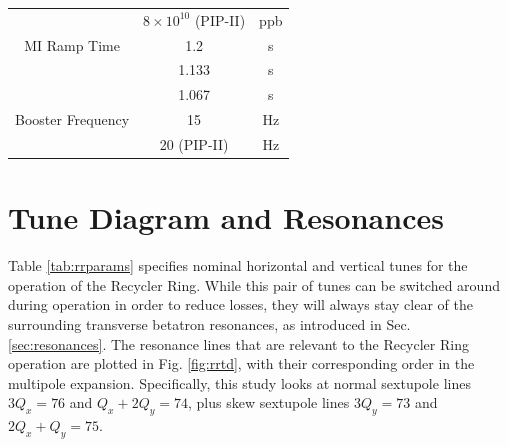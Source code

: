 \begin{table}[H]
\begin{tabular}{@{}ccc@{}}
                               & $8\times10^{10}$ (PIP-II)                  & ppb           \\
   MI Ramp Time                & 1.2                                        & s             \\
                               & 1.133                                      & s             \\
                               & 1.067                                      & s             \\
   Booster Frequency           & 15                                         & Hz            \\
                               & 20 (PIP-II)                                & Hz            \\ \bottomrule
   \end{tabular}
   \end{table}

\section{Tune Diagram and Resonances}

Table \ref{tab:rrparams} specifies nominal horizontal and vertical tunes for the operation of the Recycler Ring. While this pair of tunes can be switched around during operation in order to reduce losses, they will always stay clear of the surrounding transverse betatron resonances, as introduced in Sec. \ref{sec:resonances}. The resonance lines that are relevant to the Recycler Ring operation are plotted in Fig. \ref{fig:rrtd}, with their corresponding order in the multipole expansion. Specifically, this study looks at normal sextupole lines $3 Q_x=76$ and $Q_x+2Q_y=74$, plus skew sextupole lines $3 Q_y=73$ and $2 Q_x+Q_y=75$.

